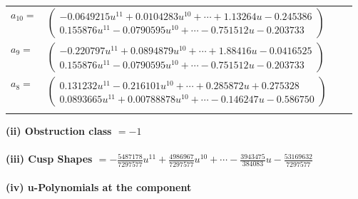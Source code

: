 \documentclass[1p]{elsarticle_modified}
\theoremstyle{definition}
\begin{document}
\begin{tabular}{m{7pt} m{180pt} m{7pt} m{180pt} }
\flushright $a_{10}=$&$\begin{pmatrix}-0.0649215 u^{11}+0.0104283 u^{10}+\cdots+1.13264 u-0.245386\\0.155876 u^{11}-0.0790595 u^{10}+\cdots-0.751512 u-0.203733\end{pmatrix}$ \\
\flushright $a_{9}=$&$\begin{pmatrix}-0.220797 u^{11}+0.0894879 u^{10}+\cdots+1.88416 u-0.0416525\\0.155876 u^{11}-0.0790595 u^{10}+\cdots-0.751512 u-0.203733\end{pmatrix}$ \\
\flushright $a_{8}=$&$\begin{pmatrix}0.131232 u^{11}-0.216101 u^{10}+\cdots+0.285872 u+0.275328\\0.0893665 u^{11}+0.00788878 u^{10}+\cdots-0.146247 u-0.586750\end{pmatrix}$\\&\end{tabular}
\flushleft \textbf{(ii) Obstruction class $= -1$}\\~\\
\flushleft \textbf{(iii) Cusp Shapes $= -\frac{5487178}{7297577} u^{11}+\frac{4986967}{7297577} u^{10}+\cdots-\frac{3943475}{384083} u-\frac{53169632}{7297577}$}\\~\\
\newpage\renewcommand{\arraystretch}{1}
\flushleft \textbf{(iv) u-Polynomials at the component}\newline \\
\end{document}
